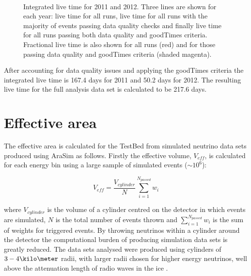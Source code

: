 \begin{figure}
  \hfill
  \\
  \hfill
  \caption{Integrated live time for 2011 and 2012. Three lines are shown for each year: live time for all runs, live time for all runs with the majority of events passing data quality checks and finally live time for all runs passing both data quality and goodTimes criteria. Fractional live time is also shown for all runs (red) and for those passing data quality and goodTimes criteria (shaded magenta).}
  \label{fig:Results:Integrated-LiveTime}
\end{figure}

After accounting for data quality issues and applying the goodTimes criteria the integrated live time is 167.4 days for 2011 and 50.2 days for 2012. The resulting live time for the full analysis data set is calculated to be 217.6 days.

\section{Effective area}
\label{sec:Results:Effective-Area}

The effective area is calculated for the TestBed from simulated neutrino data sets produced using AraSim as follows. Firstly the effective volume, $V_{eff}$, is calculated for each energy bin using a large sample of simulated events ($\sim 10^{6}$):

\begin{equation}
  V_{eff} = \frac {V_{cylinder}}{N} \sum_{i=1}^{N_{passed}} w_{i}
\end{equation}

\noindent where $V_{cylinder}$ is the volume of a cylinder centred on the detector in which events are simulated, $N$ is the total number of events thrown and $\sum_{i=1}^{N_{passed}} w_{i}$ is the sum of weights for triggered events. By throwing neutrinos within a cylinder around the detector the computational burden of producing simulation data sets is greatly reduced. The data sets analysed were produced using cylinders of $3 - 4 \kilo\meter$ radii, with larger radii chosen for higher energy neutrinos, well above the attenuation length of radio waves in the ice \cite{Allison:2014kha}. 

